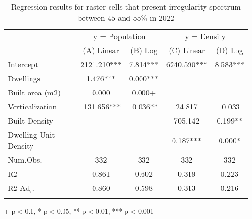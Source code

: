 \begin{table}[h]
\caption{Regression results for raster cells that present irregularity spectrum between 45 and 55\% in 2022} 
\centering
\fontsize{10.0pt}{12pt}\selectfont
\begin{tabular*}{.9\linewidth}{@{\extracolsep{\fill}}lcccc}
\toprule
 & \multicolumn{2}{c}{y = Population} & \multicolumn{2}{c}{y = Density} \\ 
\cmidrule(lr){2-3} \cmidrule(lr){4-5}
  & (A) Linear & (B) Log & (C) Linear & (D) Log \\ 
\midrule\addlinespace[2.5pt]
Intercept & 2121.210*** & 7.814*** & 6240.590*** & 8.583*** \\ 
Dwellings & 1.476*** & 0.000*** &  &  \\ 
Built area (m2) & 0.000 & 0.000+ &  &  \\ 
Verticalization & -131.656*** & -0.036** & 24.817 & -0.033 \\ 
Built Density &  &  & 705.142 & 0.199** \\ 
{Dwelling Unit Density} & {} & {} & {0.187***} & {0.000*} \\ 
\midrule
Num.Obs. & 332 & 332 & 332 & 332 \\ 
R2 & 0.861 & 0.602 & 0.319 & 0.223 \\ 
R2 Adj. & 0.860 & 0.598 & 0.313 & 0.216 \\ 
\bottomrule\vspace{0pt}
\end{tabular*}
\label{tab:regressao-1}
\begin{minipage}{.9\linewidth}
+ p < 0.1, * p < 0.05, ** p < 0.01, *** p < 0.001\\
\end{minipage}
\end{table}

